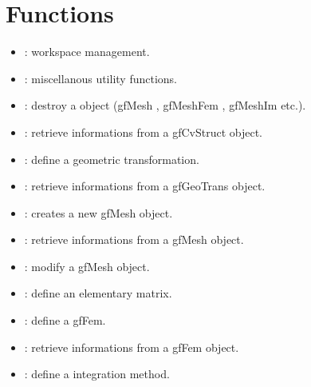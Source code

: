 \documentclass[a4paper,11pt,english]{sphinxmanual}
\begin{document}
\section{Functions}
\label{\detokenize{scilab/scilabgf:functions}}\begin{itemize}
\item {} 
\sphinxAtStartPar
{} : workspace management.

\item {} 
\sphinxAtStartPar
{} : miscellanous utility functions.

\item {} 
\sphinxAtStartPar
{} : destroy a  object (gfMesh , gfMeshFem , gfMeshIm etc.).

\item {} 
\sphinxAtStartPar
{} : retrieve informations from a gfCvStruct object.

\item {} 
\sphinxAtStartPar
{} : define a geometric transformation.

\item {} 
\sphinxAtStartPar
{} : retrieve informations from a gfGeoTrans object.

\item {} 
\sphinxAtStartPar
{} : creates a new gfMesh object.

\item {} 
\sphinxAtStartPar
{} : retrieve informations from a gfMesh object.

\item {} 
\sphinxAtStartPar
{} : modify a gfMesh object.

\item {} 
\sphinxAtStartPar
{} : define an elementary matrix.

\item {} 
\sphinxAtStartPar
{} : define a gfFem.

\item {} 
\sphinxAtStartPar
{} : retrieve informations from a gfFem object.

\item {} 
\sphinxAtStartPar
{} : define a integration method.


\end{itemize}
\end{document}
